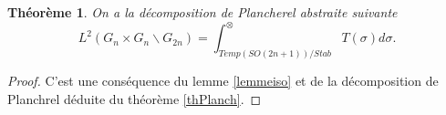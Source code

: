 \documentclass{amsart}
\newtheorem{theoreme}{Théorème}[section]
\begin{document}
\begin{theoreme}
On a la décomposition de Plancherel abstraite suivante
\begin{equation}
L^2(G_n \times G_n \backslash G_{2n}) = \int^{\otimes}_{Temp(SO(2n+1))/Stab} T(\sigma) d\sigma.
\end{equation}
\end{theoreme}

\begin{proof}
C'est une conséquence du lemme \ref{lemmeiso} et de la décomposition de Planchrel déduite du théorème \ref{thPlanch}.
\end{proof}

 
 
\end{document}
